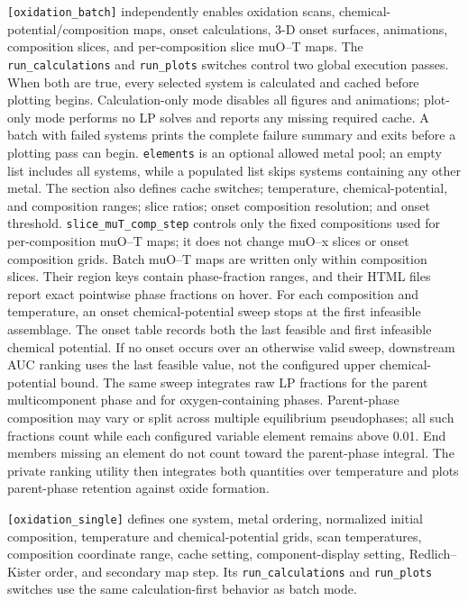\documentclass[11pt,letterpaper]{article}
\newcommand{\setting}[1]{\nolinkurl{#1}}
\begin{document}
\setting{[oxidation_batch]} independently enables oxidation scans,
chemical-potential/composition maps, onset calculations, 3-D onset surfaces,
animations, composition slices, and per-composition slice muO--T maps.
The \setting{run_calculations} and \setting{run_plots} switches control two
global execution passes. When both are true, every selected system is
calculated and cached before plotting begins. Calculation-only mode disables
all figures and animations; plot-only mode performs no LP solves and reports
any missing required cache. A batch with failed systems prints the complete
failure summary and exits before a plotting pass can begin.
\setting{elements} is an optional allowed metal pool; an empty list includes
all systems, while a populated list skips systems containing any other metal.
The section also defines cache switches; temperature, chemical-potential, and
composition ranges; slice ratios; onset composition resolution; and onset
threshold. \setting{slice_muT_comp_step} controls only the fixed compositions
used for per-composition muO--T maps; it does not change muO--x slices or onset
composition grids. Batch muO--T maps are written only within composition slices.
Their region keys contain phase-fraction ranges, and their HTML files report
exact pointwise phase fractions on hover.
For each composition and temperature, an onset chemical-potential sweep stops
at the first infeasible assemblage. The onset table records both the last
feasible and first infeasible chemical potential. If no onset occurs over an
otherwise valid sweep, downstream AUC ranking uses the last feasible value,
not the configured upper chemical-potential bound.
The same sweep integrates raw LP fractions for the parent multicomponent phase
and for oxygen-containing phases. Parent-phase composition may vary or split
across multiple equilibrium pseudophases; all such fractions count while each
configured variable element remains above 0.01. End members missing an element
do not count toward the parent-phase integral. The private ranking utility then
integrates both quantities over temperature and plots parent-phase retention
against oxide formation.

\setting{[oxidation_single]} defines one system, metal ordering, normalized
initial composition, temperature and chemical-potential grids, scan
temperatures, composition coordinate range, cache setting, component-display
setting, Redlich--Kister order, and secondary map step. Its
\setting{run_calculations} and \setting{run_plots} switches use the same
calculation-first behavior as batch mode.
\end{document}
